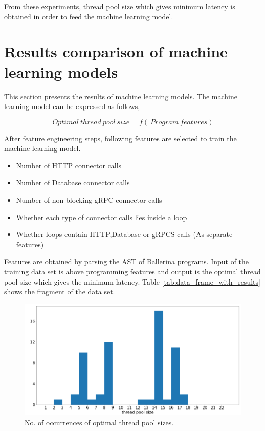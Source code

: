 From these experiments, thread pool size which gives minimum latency is obtained in order to feed the machine learning model. 

\section{Results comparison of machine learning models}

This section presents the results of machine learning models. The machine learning model can be expressed as follows,

$$ Optimal\:thread\:pool\:size = f(\:Program\:features)$$

After feature engineering steps, following features are selected to train the machine learning model.

\begin{itemize}
	\item Number of HTTP connector calls
	\item Number of Database connector calls
	\item Number of non-blocking gRPC connector calls
	\item Whether each type of connector calls lies inside a loop 
	\item Whether loops contain HTTP,Database or gRPCS calls (As separate features)
\end{itemize} 

Features are obtained by parsing the AST of Ballerina programs. Input of the training data set is above programming features and output is the optimal thread pool size which gives the minimum latency. Table \ref{tab:data_frame_with_results} shows the fragment of the data set.

\begin{figure}[htbp]
	\begin{center}
		\includegraphics[scale=0.5]{figures/pool_size_dist.png}
	\end{center}
	\caption{No. of occurrences of optimal thread pool sizes.}
	\label{pool_size_dist}
\end{figure}

